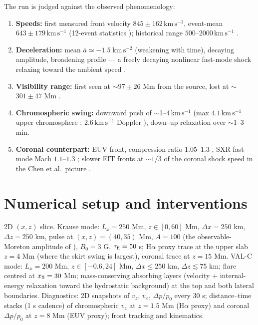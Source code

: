 \documentclass[11pt,a4paper]{article}
\newcommand{\kms}{\,\mathrm{km\,s^{-1}}}
\begin{document}
The run is judged against the observed phenomenology:
\begin{enumerate}\itemsep2pt
\item \textbf{Speeds:} first measured front velocity $845\pm162\kms$, event-mean
$643\pm179\kms$ (12-event statistics \cite{Warmuth2004a}); historical range
$500$--$2000\kms$ \cite{Moreton1960,SmithHarvey1971}.
\item \textbf{Deceleration:} mean $\bar a\simeq-1.5\;\mathrm{km\,s^{-2}}$ (weakening with
time), decaying amplitude, broadening profile --- a freely decaying nonlinear fast-mode
shock relaxing toward the ambient speed \cite{Warmuth2004a,Warmuth2004b}.
\item \textbf{Visibility range:} first seen at $\sim$$97\pm26$ Mm from the source, lost at
$\sim$$301\pm47$ Mm \cite{Warmuth2004a}.
\item \textbf{Chromospheric swing:} downward push of $\sim$1--4$\kms$ (max $4.1\kms$
upper chromosphere \cite{Cabezas2019}; $2.6\kms$ Doppler \cite{Balasubramaniam2010}),
down--up relaxation over $\sim$1--3 min.
\item \textbf{Coronal counterpart:} EUV front, compression ratio $1.05$--$1.3$
\cite{Muhr2011}, SXR fast-mode Mach $1.1$--$1.3$ \cite{Narukage2002,Hudson2003}; slower
EIT fronts at $\sim$$1/3$ of the coronal shock speed in the Chen et al.\ picture
\cite{Chen2002,Chen2005}.
\end{enumerate}

\section{Numerical setup and interventions}

2D $(x,z)$ slice. Krause mode: $L_x=250$ Mm, $z\in[0,60]$ Mm, $\Delta x=250$ km,
$\Delta z=250$ km, pulse at $(x,z)=(40,35)$ Mm, $A=100$ (the observable-Moreton amplitude of
\cite{Krause2015}), $B_0=3$ G, $\tau_{\rm fl}=50$ s; H$\alpha$ proxy trace at the upper
slab $z=4$ Mm (where the skirt swing is largest), coronal trace at $z=15$ Mm. VAL-C mode: $L_x=200$ Mm, $z\in[-0.6,24]$ Mm, $\Delta x\le250$ km,
$\Delta z\lesssim75$ km; flare centred at $x_{\rm fl}=30$ Mm;
mass-conserving absorbing layers (velocity $+$ internal-energy relaxation toward the
hydrostatic background) at the top and both lateral boundaries. Diagnostics: 2D snapshots
of $v_z$, $v_x$, $\Delta p/p_0$ every 30 s; distance--time stacks (1 s cadence) of
chromospheric $v_z$ at $z=1.5$ Mm (H$\alpha$ proxy) and coronal $\Delta p/p_0$ at
$z=8$ Mm (EUV proxy); front tracking and kinematics.
\end{document}
